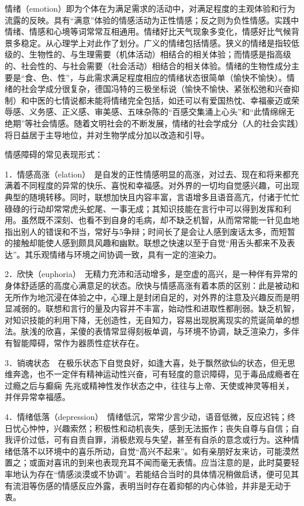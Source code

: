 情绪（emotion）即为个体在为满足需求的活动中，对满足程度的主观体验和行为流露的反映。具有``满意''体验的情感活动为正性情感；反之则为负性情感。实践中情绪、情感和心境等词常常互相通用。情绪好比天气现象多变化，情感好比气候背景多稳定。从心理学上对此作了划分。广义的情绪包括情感。狭义的情绪是指较低级的、生物性的、与生理需要（机体活动）相结合的相关体验；而情感是指高级的、社会性的、与社会需要（社会活动）相结合的相关体验。情绪的生物性成分主要是``食、色、性''，与此需求满足程度相应的情绪状态很简单（愉快不愉快）。情绪的社会学成分很复杂，德国冯特的三极坐标说（愉快不愉快、紧张松弛和兴奋抑制）和中医的七情说都未能将情绪完全包括，如还可以有爱国热忱、幸福豪迈或荣辱感、义务感、正义感、审美感、五味杂陈的``百感交集涌上心头''和``此情绵绵无绝期''等社会情感。随着文明社会的不断发展，情绪的社会学成分（人的社会实践）将日益居于主导地位，并对生物学成分加以改造和引导。

情感障碍的常见表现形式：

1．情感高涨（elation）　是自发的正性情感明显的高涨，对过去、现在和将来都充满着不同程度的异常的快乐、喜悦和幸福感。对外界的一切均自觉感兴趣，可出现典型的随境转移。同时，联想加快且内容丰富，言语增多且语音高亢，付诸于忙忙碌碌的行动却常常虎头蛇尾、一事无成；其知识技能在言行中可以得到发挥和利用。虽然既不深刻、也看不到自身的毛病，却不缺乏机智，从而常常能一针见血地指出别人的错误和不当，常好与5争辩；时间长了是会让人感到废话太多，而短暂的接触却能使人感到颇具风趣和幽默。联想之快速以至于自觉``用舌头都来不及表达''。其乐观情绪与环境之间协调一致，具有一定的渲染力。

2．欣快（euphoria）　无精力充沛和活动增多，是空虚的高兴，是一种伴有异常的身体舒适感的高度心满意足的状态。欣快与情感高涨有着本质的区别：此是被动和无所作为地沉浸在体验之中，心理上是封闭自足的，对外界的注意及兴趣反而是明显减弱的。联想和言行的量及内容并不丰富，始动性和进取性都削弱。缺乏机智，对知识技能的利用下降，无创造性，无自知力，容易出现脱离现实的荒诞简单的想法。肤浅的欣喜，呆傻的表情常显得刻板单调，与环境不协调，缺乏渲染力，多伴有智能障碍，常作为器质性症状存在。

3．销魂状态　在极乐状态下自觉良好，如逢大喜，处于飘然欲仙的状态，但无思维奔逸，也不一定伴有精神运动性兴奋，可有轻度的意识障碍，见于毒品成瘾者在过瘾之后与癫痫
先兆或精神性发作状态之中，往往与上帝、天使或神灵等相关，并伴异常幸福感。

4．情绪低落（depression）　情绪低沉，常常少言少动，语音低微，反应迟钝；终日忧心忡忡，兴趣索然；积极性和动机丧失，感到无法振作；丧失自尊与自信；自我评价过低，可有自责自罪，消极悲观与失望，甚至有自杀的意念或行为。这种情绪低落不以环境中的喜乐所动，自觉``高兴不起来''。如有亲朋好友来访，可能漠然置之；或面对喜讯的到来也表现充耳不闻而毫无表情。应当注意的是，此时莫要轻率地认为存在``情感淡漠或不协调''。若能结合当时的具体情况稍做启诱，便可见其有流泪等伤感的情感反应外露，表明当时存在着抑郁的内心体验，并非是无动于衷。

